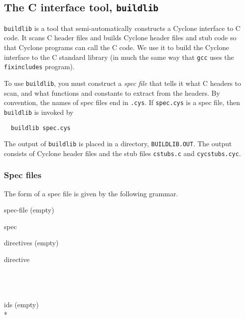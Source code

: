 \subsection{The C interface tool, \texttt{buildlib}}

\texttt{buildlib} is a tool that semi-automatically constructs a
Cyclone interface to C code.  It scans C header files and builds
Cyclone header files and stub code so that Cyclone programs can call
the C code.  We use it to build the Cyclone interface to the C
standard library (in much the same way that \texttt{gcc} uses the
\texttt{fixincludes} program).

To use \texttt{buildlib}, you must construct a \emph{spec file} that
tells it what C headers to scan, and what functions and constants to
extract from the headers.  By convention, the names of spec files end
in \texttt{.cys}.  If \texttt{spec.cys} is a spec file, then
\texttt{buildlib} is invoked by
\begin{verbatim}
  buildlib spec.cys
\end{verbatim}
The output of \texttt{buildlib} is placed in a directory,
\texttt{BUILDLIB.OUT}.  The output consists of Cyclone header files
and the stub files \texttt{cstubs.c} and \texttt{cycstubs.cyc}.  

\subsubsection*{Spec files}

The form of a spec file is given by the following grammar.

\begin{rules}{spec-file}
  (empty)\\
   
\end{rules}
\begin{rules}{spec}
   \tk{:}  \tk{;}
\end{rules}
\begin{rules}{directives}
  (empty)\\
   
\end{rules}
\begin{rules}{directive}
 \tk{\lb}  \tk{\rb} \\
 \tk{\lb}  \tk{\rb} \\
 \opt \tk{\lb}  \tk{\rb} \\
 \opt \tk{\lb}  \tk{\rb} \\
 \opt \tk{\lb}  \tk{\rb}
\end{rules}
\begin{rules}{ids}
  (empty)\\
   * 
\end{rules}

